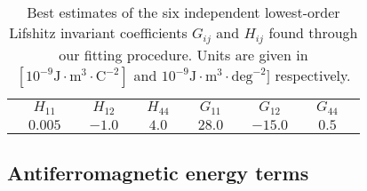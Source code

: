 \documentclass[%
 reprint,
superscriptaddress,
 amsmath,amssymb,
prb,
]{revtex4-1}
\begin{document}
\begin{table}[h!]
\caption{\label{tab:gradCoeff}
Best estimates of the six independent lowest-order Lifshitz invariant coefficients $G_{ij}$ and $H_{ij}$ found through our fitting procedure. Units are given in $[10^{-9}\mathrm{J}\cdot\mathrm{m}^3\cdot \mathrm{C}^{-2}]$ and $10^{-9}\mathrm{J}\cdot\mathrm{m}^3\cdot\mathrm{deg}^{-2}]$ respectively.
}
\begin{ruledtabular}
\begin{tabular}{c c c c c c c c c c c c c }
 & $H_{11}$ & & $H_{12}$ & & $H_{44}$ & & $G_{11}$ & &  $G_{12}$ & & $G_{44}$    \\ 
  & $0.005$ & & $-1.0$ & & $4.0$  & & $28.0$ & & $-15.0$ & & $0.5$    \\ 
\end{tabular}
\end{ruledtabular}
\end{table}


\subsection{Antiferromagnetic energy terms}\label{sec:magE}
\end{document}
